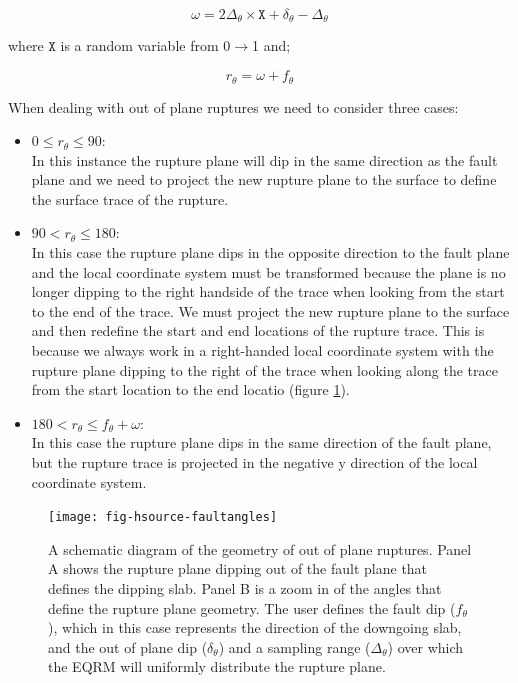 \begin{equation}
\omega = 2\Delta_\theta  \times \mathtt{X} + \delta_\theta - \Delta_\theta
\end{equation}

where $\mathtt{X}$ is a random variable from 0$\rightarrow$1 and;

\begin{equation}
r_\theta = \omega + f_\theta
\end{equation}

When dealing with out of plane ruptures we need to consider three cases:
\begin{itemize} 
\item $0 \leq r_\theta \leq 90:$ \\ In this instance the rupture plane will dip in the same direction as the fault plane and we need to project the new rupture plane to the surface to define the surface trace of the rupture.
\item $90 <  r_\theta \leq 180:$ \\ In this case the rupture plane dips in the opposite direction to the fault plane and the local coordinate system must be transformed because the plane is no longer dipping to the right handside of the trace when looking from the start to the end of the trace. We must project the new rupture plane to the surface and then redefine the start and end locations of the rupture trace. This is because we always work in a right-handed local coordinate system with the rupture plane dipping to the right of the trace when looking along the trace from the start location to the end locatio (figure \ref{fig:intraslabGeom}).  
\item $180 < r_\theta \leq f_\theta + \omega :$ \\ In this case the rupture plane dips in the same direction of the fault plane, but the rupture trace is projected in the negative y direction of the local coordinate system. 
\end{itemize}
\begin{figure}[htp]
\centerline{\texttt{[image: fig-hsource-faultangles]}}
\caption{A schematic diagram of the geometry of out of plane ruptures. Panel A shows the rupture plane dipping out of the fault plane that defines the dipping slab. Panel B is a zoom in of the angles that define the rupture plane geometry. The user defines the fault dip ($f_\theta$), which in this case represents the direction of the downgoing slab, and the out of plane dip ($\delta_\theta$) and a sampling range ($\Delta_\theta$) over which the EQRM will uniformly distribute the rupture plane. }
\label{fig:intraslabGeom}
\end{figure}

